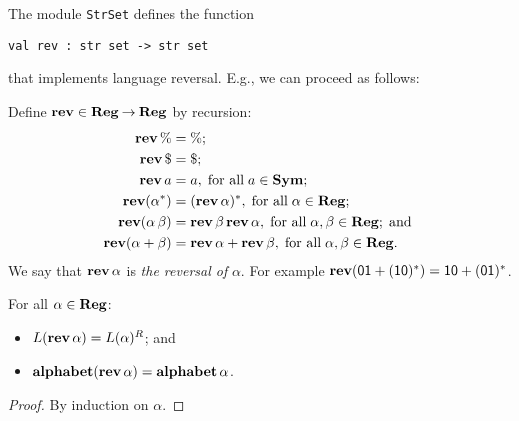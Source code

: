 The module \texttt{StrSet}
%
defines the function
\begin{verbatim}
val rev : str set -> str set
\end{verbatim}
%
that implements language reversal. E.g., we can
proceed as follows:


Define $\mathbf{rev}\in\mathbf{Reg}\mathbin{\to}\mathbf{Reg}$ by recursion:
%
%
%
%
\begin{align*}
\mathbf{rev}\,\% &= \%; \\
\mathbf{rev}\,\$ &= \$; \\
\mathbf{rev}\,a &= a, \;\allowbreak\mbox{for all}\allowbreak\;a\in\mathbf{Sym}; \\
\mathbf{rev}(\alpha^*) &= (\mathbf{rev}\,\alpha)^*, \;\allowbreak\mbox{for all}\allowbreak\;\alpha\in\mathbf{Reg};\\
\mathbf{rev}(\alpha\,\beta) &= \mathbf{rev}\,\beta\,\mathbf{rev}\,\alpha ,
\;\allowbreak\mbox{for all}\allowbreak\;\alpha,\beta\in\mathbf{Reg}; \;\allowbreak\mbox{and}\allowbreak\; \\
\mathbf{rev}(\alpha+\beta) &= \mathbf{rev}\,\alpha + \mathbf{rev}\,\beta ,
\;\allowbreak\mbox{for all}\allowbreak\;\alpha,\beta\in\mathbf{Reg} .
\end{align*}
We say that $\mathbf{rev}\,\alpha$ is \emph{the reversal of} $\alpha$.
For example $\mathbf{rev}(\mathsf{01+(10)^*}) = \mathsf{10 + (01)^*}$.

\begin{theorem}
\label{RegExpRev}
For all $\alpha\in\mathbf{Reg}$:
\begin{itemize}
\item $L(\mathbf{rev}\,\alpha) = L(\alpha)^R$; and

\item $\mathbf{alphabet}(\mathbf{rev}\,\alpha) = \mathbf{alphabet}\,\alpha$.
\end{itemize}
\end{theorem}

\begin{proof}
By induction on $\alpha$.
\end{proof}

